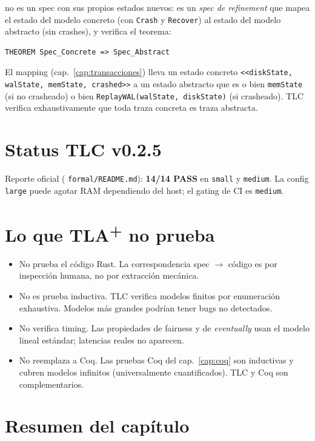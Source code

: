  no es un spec con sus propios
estados nuevos: es un \emph{spec de refinement} que mapea el estado
del modelo concreto (con \texttt{Crash} y \texttt{Recover}) al estado
del modelo abstracto (sin crashes), y verifica el teorema:

\begin{lstlisting}[language=tla]
THEOREM Spec_Concrete => Spec_Abstract
\end{lstlisting}

El mapping (cap.~\ref{cap:transacciones}) lleva un estado concreto
\texttt{<<diskState, walState, memState, crashed>>} a un estado
abstracto que es o bien \texttt{memState} (si no crasheado) o bien
\texttt{ReplayWAL(walState, diskState)} (si crasheado). TLC verifica
exhaustivamente que toda traza concreta es traza abstracta.

\section{Status TLC v0.2.5}

Reporte oficial ( \texttt{formal/README.md}):
\textbf{14/14 PASS} en \texttt{small} y \texttt{medium}. La config
\texttt{large} puede agotar RAM dependiendo del host; el gating de CI
es \texttt{medium}.

\section{Lo que TLA\textsuperscript{+} no prueba}

\begin{itemize}
  \item No prueba el código Rust. La correspondencia spec $\to$ código
    es por inspección humana, no por extracción mecánica.
  \item No es prueba inductiva. TLC verifica modelos finitos por
    enumeración exhaustiva. Modelos más grandes podrían tener bugs no
    detectados.
  \item No verifica timing. Las propiedades de fairness y de
    \emph{eventually} usan el modelo lineal estándar; latencias reales
    no aparecen.
  \item No reemplaza a Coq. Las pruebas Coq del cap.~\ref{cap:coq}
    son inductivas y cubren modelos infinitos (universalmente
    cuantificados). TLC y Coq son complementarios.
\end{itemize}

\section*{Resumen del capítulo}

